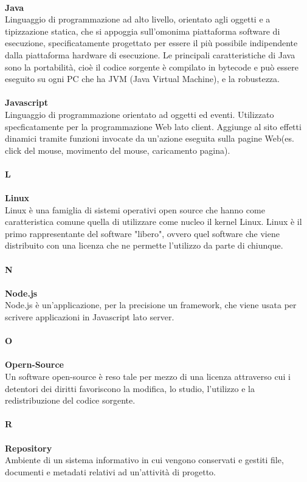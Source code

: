 \\
\textbf{Java} \\
Linguaggio di programmazione ad alto livello, orientato agli oggetti e a tipizzazione statica, che si appoggia sull'omonima piattaforma software di esecuzione, specificatamente progettato per essere il più possibile indipendente dalla piattaforma hardware di esecuzione. Le principali caratteristiche di Java sono la portabilità, cioè il codice sorgente
è compilato in bytecode e può essere eseguito su ogni PC che ha JVM (Java Virtual Machine), e la robustezza. \\
\\
\textbf{Javascript} \\
Linguaggio di programmazione orientato ad oggetti ed eventi. Utilizzato specficatamente
per la programmazione Web lato client. Aggiunge al sito effetti dinamici tramite funzioni
invocate da un'azione eseguita sulla pagine Web(es. click del mouse, movimento del
mouse, caricamento pagina). \\
\\
\textbf{L} \\
\\
\textbf{Linux} \\
Linux è una famiglia di sistemi operativi open source che hanno come caratteristica comune quella di utilizzare come nucleo il kernel Linux. Linux è il primo rappresentante del software "libero", ovvero quel software che viene distribuito con una licenza che ne permette l'utilizzo da parte di chiunque. \\
\\
\textbf{N}\\
\\
\textbf{Node.js} \\
Node.js è un’applicazione, per la precisione un framework, che viene usata per scrivere applicazioni in Javascript lato server. \\
\\
\textbf{O} \\
\\
\textbf{Opern-Source} \\
Un software open-source è reso tale per mezzo di una licenza attraverso cui i detentori dei
diritti favoriscono la modifica, lo studio, l'utilizzo e la redistribuzione del codice sorgente.\\
\\
\textbf{R} \\
\\
\textbf{Repository} \\
Ambiente di un sistema informativo in cui vengono conservati e gestiti file, documenti e metadati relativi ad un’attività di progetto. \\
